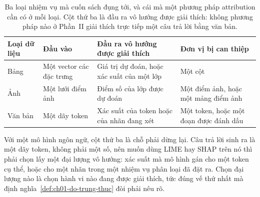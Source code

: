 \begin{table}[htbp]
  \centering
  \footnotesize
  \caption{Ba loại nhiệm vụ mà cuốn sách đụng tới, và cái mà một phương pháp
  attribution cần có ở mỗi loại. Cột thứ ba là đầu ra vô hướng được giải thích:
  không phương pháp nào ở Phần~II giải thích trực tiếp một câu trả lời bằng văn
  bản.}
  \label{tab:ch02-ba-loai-nhiem-vu}
  \begin{tabular}{@{}p{2cm}p{3cm}p{4cm}p{3cm}@{}}
    \toprule
    Loại dữ liệu & Đầu vào & Đầu ra vô hướng được giải thích & Đơn vị bị can
    thiệp \\
    \midrule
    Bảng & Một vector các đặc trưng & Giá trị dự đoán, hoặc xác suất của một lớp
    & Một cột \\
    \addlinespace
    Ảnh & Một lưới điểm ảnh & Điểm số của lớp được dự đoán & Một điểm ảnh, hoặc
    một mảng điểm ảnh \\
    \addlinespace
    Văn bản & Một dãy token & Xác suất của token hoặc của nhãn đang xét & Một
    token, hoặc một đoạn được đánh dấu \\
    \bottomrule
  \end{tabular}
\end{table}

Với một mô hình ngôn ngữ, cột thứ ba là chỗ phải dừng lại. Câu trả lời sinh ra
là một dãy token, không phải một số, nên muốn dùng LIME hay SHAP trên nó thì
phải chọn lấy một đại lượng vô hướng: xác suất mà mô hình gán cho một token cụ
thể, hoặc cho một nhãn trong một nhiệm vụ phân loại đã đặt ra. Chọn đại lượng
nào là chọn hành vi nào đang được giải thích, tức đúng vế thứ nhất mà
định nghĩa~\ref{def:ch01-do-trung-thuc} đòi phải nêu rõ.
